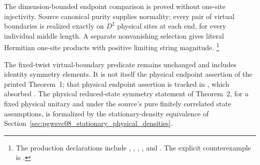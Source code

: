 \documentclass[11pt]{article}
\begin{document}
The dimension-bounded endpoint comparison is proved without one-site
injectivity. Source canonical purity supplies normality; every pair of
virtual boundaries is realized exactly on $D^2$ physical sites at each end,
for every individual middle length. A separate nonvanishing selection gives
literal Hermitian one-site products with positive limiting string magnitude.
\footnote{The production declarations include
    ,
    ,
    ,
    ,
    and .
    The explicit counterexample is
    .}

The fixed-twist virtual-boundary predicate remains unchanged and includes
identity symmetry elements. It is not itself the physical endpoint assertion
of the printed Theorem~1; that physical endpoint assertion is tracked in
, which absorbed . The physical reduced-state
symmetry statement of Theorem~2, for a fixed physical unitary and under the
source's pure finitely correlated state assumptions, is formalized by the
stationary-density equivalence of
Section~\ref{sec:pgwsvc08_stationary_physical_densities}.



\end{document}

